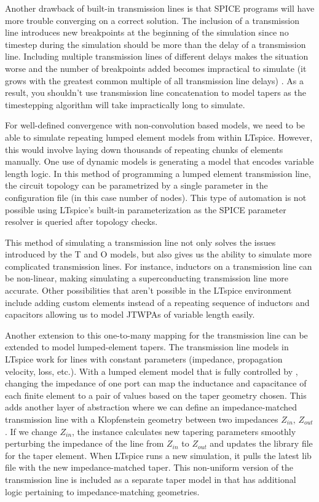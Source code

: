 Another drawback of built-in transmission lines is that 
SPICE programs will have more trouble converging on a correct solution. 
The inclusion of a transmission line introduces new breakpoints at the beginning of the simulation since no timestep during the simulation should be more than the delay of a
transmission line. Including multiple transmission lines of different delays makes the 
situation worse and the number of breakpoints added becomes impractical to simulate (it grows with the 
greatest common multiple of all transmission line delays) \cite{spice-book}.
As a result, you shouldn't use transmission line concatenation to model tapers
as the timestepping algorithm will take impractically long to simulate.

For well-defined convergence with non-convolution based models, we need to be able to simulate repeating
lumped element models from within LTspice. 
However, this would involve laying down thousands 
of repeating chunks of elements manually. One use of dynamic models is generating a model 
that encodes variable length logic. In this method of programming a lumped element transmission
line, the circuit topology can be parametrized by a single parameter in the configuration file 
(in this case number of nodes). This type of automation is not possible using LTspice's built-in
parameterization as the SPICE parameter resolver is queried after topology checks.

This method of simulating a transmission line not only solves the issues introduced by the
T and O models, but also gives us the ability to simulate more complicated transmission lines.
For instance, inductors on a transmission line can be non-linear, making simulating a superconducting
transmission line more accurate. Other possibilities that aren't possible in the LTspice environment
include adding custom elements instead of a repeating sequence of inductors and capacitors allowing us to
model JTWPAs of variable length easily.

Another extension to this one-to-many mapping for the transmission line can be extended to model
lumped-element tapers. The transmission line models in LTspice work for lines with constant 
parameters (impedance, propagation velocity, loss, etc.). With a lumped element model that is fully
controlled by , changing the impedance of one port can map the inductance and capacitance
of each finite element to a pair of values based on the taper geometry chosen. This adds another layer
of abstraction where we can define an impedance-matched transmission line with a Klopfenstein geometry
between two impedances $Z_{in},\, Z_{out}$. If we change $Z_{in}$, the  instance calculates
new tapering parameters smoothly perturbing the impedance of the line from $Z_{in}$ to $Z_{out}$ and
updates the library file for the taper element. 
When LTspice runs a new simulation, it pulls the latest
lib file with the new impedance-matched taper. This non-uniform version of the transmission line
is included as a separate taper model in  that has additional logic pertaining to 
impedance-matching geometries.

